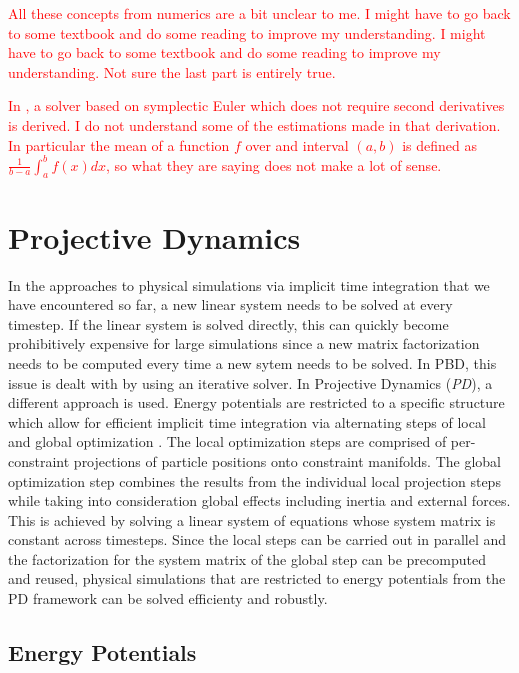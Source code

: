 \textcolor{red}{
    All these concepts from numerics are a bit unclear to me. I might have to go back to some textbook and do some reading to improve my understanding. 
    I might have to go back to some textbook and do some reading to improve my understanding. Not sure the last part is entirely true.}

\textcolor{red}{
    In \cite{servin2006}, a solver based on symplectic Euler which does not require second derivatives is derived. I do not understand some of the
    estimations made in that derivation. In particular the mean of a function $f$ over and interval $(a, b)$ is defined as $\frac{1}{b-a}
    \int_a^b f(x) dx$, so what they are saying does not make a lot of sense.}


\section{Projective Dynamics}\label{s:pd}

In the approaches to physical simulations via implicit time integration that we have encountered so far, a new linear system needs to be solved
at every timestep. If the linear system is solved directly, this can quickly become prohibitively expensive for large simulations since 
a new matrix factorization needs to be computed every time a new sytem needs to be solved. In PBD, this issue is dealt with by using an iterative 
solver. In Projective Dynamics (\emph{PD}), a different approach is used. Energy potentials are restricted to a specific structure which allow for 
efficient implicit time integration via alternating steps of local and global optimization \cite{bouaziz2014}. The local optimization 
steps are comprised of 
per-constraint projections of particle positions onto constraint manifolds. The global optimization step combines the results from the individual 
local projection steps while taking into consideration global effects including inertia and external forces. This is achieved by solving a 
linear system of equations whose system matrix is constant across timesteps. Since the local steps can be carried out in parallel and the 
factorization for the system matrix of the global step can be precomputed and reused, physical simulations that are restricted to energy potentials 
from the PD framework can be solved efficienty and robustly.

\subsection{Energy Potentials}\label{ss:pd-potentials}

